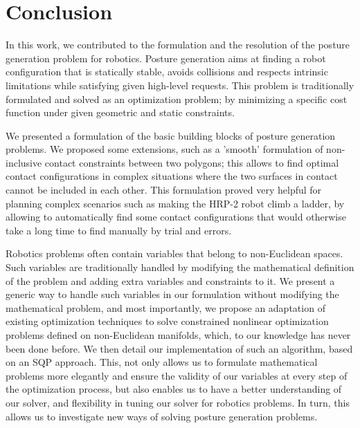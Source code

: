 

\chapter*{Conclusion}
\label{cha:conclusion}

In this work, we contributed to the formulation and the resolution of the posture generation problem for robotics.
Posture generation aims at finding a robot configuration that is statically stable, avoids collisions and respects intrinsic limitations while satisfying given high-level requests.
This problem is traditionally formulated and solved as an optimization problem; by minimizing a specific cost function under given geometric and static constraints.

We presented a formulation of the basic building blocks of posture generation problems.
We proposed some extensions, such as a 'smooth' formulation of non-inclusive contact constraints between two polygons; this allows to find optimal contact configurations in complex situations where the two surfaces in contact cannot be included in each other.
This formulation proved very helpful for planning complex scenarios such as making the HRP-2 robot climb a ladder, by allowing to automatically find some contact configurations that would otherwise take a long time to find manually by trial and errors.

Robotics problems often contain variables that belong to non-Euclidean spaces.
Such variables are traditionally handled by modifying the mathematical definition of the problem and adding extra variables and constraints to it.
We present a generic way to handle such variables in our formulation without modifying the mathematical problem, and most importantly, we propose an adaptation of existing optimization techniques to solve constrained nonlinear optimization problems defined on non-Euclidean manifolds, which, to our knowledge has never been done before.
We then detail our implementation of such an algorithm, based on an SQP approach.
This, not only allows us to formulate mathematical problems more elegantly and ensure the validity of our variables at every step of the optimization process, but also enables us to have a better understanding of our solver, and flexibility in tuning our solver for robotics problems.
In turn, this allows us to investigate new ways of solving posture generation problems.

